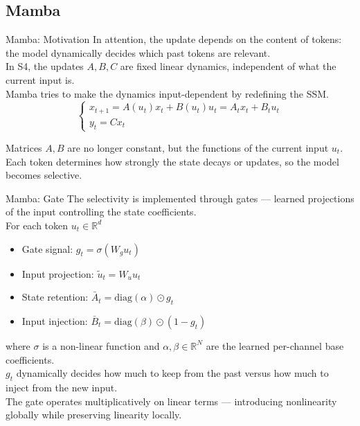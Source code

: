 \documentclass[xcolor=dvipsnames,aspectratio=169]{beamer}
\begin{document}
        \subsection{Mamba}
            \begin{frame}{Mamba: Motivation}
                In attention, the update depends on the content of tokens: the model dynamically decides which past tokens are relevant. \\ 
                In S4, the updates $A, B, C$ are fixed linear dynamics, independent of what the current input is. \\
                Mamba tries to make the dynamics input-dependent by redefining the SSM. \\

                \begin{equation*}
                    \begin{cases}
                        x_{t + 1} = A(u_{t}) x_{t} + B(u_{t}) u_{t} = A_{t} x_{t} + B_{t} u_{t} \\
                        y_{t} = Cx_{t}
                    \end{cases}
                \end{equation*}

                Matrices $A, B$ are no longer constant, but the functions of the current input $u_{t}$. \\
                Each token determines how strongly the state decays or updates, so the model becomes selective.
            \end{frame}

            \begin{frame}{Mamba: Gate}
                The selectivity is implemented through gates — learned projections of the input controlling the state coefficients. \\
                For each token $u_{t} \in \mathbb{R}^{d}$

                \begin{itemize}
                    \item Gate signal: $g_{t} = \sigma (W_{g} u_{t})$
                    \item Input projection: $\tilde{u}_{t} = W_{u} u_{t}$
                    \item State retention: $\bar{A}_{t} = \mathrm{diag} (\alpha) \odot g_{t}$
                    \item Input injection: $\bar{B}_{t} = \mathrm{diag} (\beta) \odot (1 - g_{t})$
                \end{itemize}

                where $\sigma$ is a non-linear function and $\alpha, \beta \in \mathbb{R}^{N}$ are the learned per-channel base coefficients. \\
                $g_{t}$ dynamically decides how much to keep from the past versus how much to inject from the new input. \\
                The gate operates multiplicatively on linear terms — introducing nonlinearity globally while preserving linearity locally.
            \end{frame}
\end{document}
